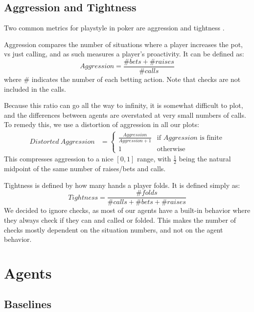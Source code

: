 \subsection{Aggression and Tightness}

Two common metrics for playstyle in poker are aggression and tightness \cite{PokerStrategy}.

Aggression compares the number of situations where a player increases the pot, vs just calling, and as such measures a player's proactivity. It can be defined as:
\begin{equation}
    Aggression = \frac{\# bets + \# raises}{\# calls}
\end{equation} where \# indicates the number of each betting action. Note that checks are not included in the calls.

Because this ratio can go all the way to infinity, it is somewhat difficult to plot, and the differences between agents are overstated at very small numbers of calls. To remedy this, we use a distortion of aggression in all our plots:
\begin{equation}
\begin{split}
Distorted\ Aggression &= \begin{cases}
\frac{Aggression}{Aggression + 1} &\mbox{if }Aggression\mbox{ is finite} \\
1 &\mbox{otherwise}
\end{cases}
\end{split}
\end{equation}
This compresses aggression to a nice $[0, 1]$ range, with $\frac{1}{2}$ being the natural midpoint of the same number of raises/bets and calls.

Tightness is defined by how many hands a player folds. It is defined simply as:
\begin{equation}
    Tightness = \frac{\# folds}{\# calls + \# bets + \# raises}
\end{equation}
We decided to ignore checks, as most of our agents have a built-in behavior where they always check if they can and called or folded. This makes the number of checks mostly dependent on the situation numbers, and not on the agent behavior.



\section{Agents}

\subsection{Baselines}



